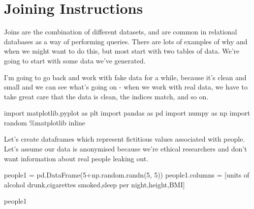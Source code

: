 \documentclass[
  letterpaper,
  DIV=11,
  numbers=noendperiod]{scrreprt}
\newenvironment{Shaded}{\begin{snugshade}}{\end{snugshade}}
\newcommand{\DecValTok}[1]{\textcolor[rgb]{0.68,0.00,0.00}{#1}}
\newcommand{\ImportTok}[1]{\textcolor[rgb]{0.00,0.46,0.62}{#1}}
\newcommand{\NormalTok}[1]{\textcolor[rgb]{0.00,0.23,0.31}{#1}}
\newcommand{\OperatorTok}[1]{\textcolor[rgb]{0.37,0.37,0.37}{#1}}
\newcommand{\StringTok}[1]{\textcolor[rgb]{0.13,0.47,0.30}{#1}}
\begin{document}
\hypertarget{joining-instructions}{%
\section{Joining Instructions}\label{joining-instructions}}

Joins are the combination of different datasets, and are common in
relational databases as a way of performing queries. There are lots of
examples of why and when we might want to do this, but most start with
two tables of data. We're going to start with some data we've generated.

I'm going to go back and work with fake data for a while, because it's
clean and small and we can see what's going on - when we work with real
data, we have to take great care that the data is clean, the indices
match, and so on.

\begin{Shaded}
\begin{Highlighting}[]
\ImportTok{import}\NormalTok{ matplotlib.pyplot }\ImportTok{as}\NormalTok{ plt}
\ImportTok{import}\NormalTok{ pandas }\ImportTok{as}\NormalTok{ pd}
\ImportTok{import}\NormalTok{ numpy }\ImportTok{as}\NormalTok{ np}
\ImportTok{import}\NormalTok{ random}
\OperatorTok{\%}\NormalTok{matplotlib inline}
\end{Highlighting}
\end{Shaded}

Let's create dataframes which represent fictitious values associated
with people. Let's assume our data is anonymised because we're ethical
researchers and don't want information about real people leaking out.

\begin{Shaded}
\begin{Highlighting}[]
\NormalTok{people1 }\OperatorTok{=}\NormalTok{ pd.DataFrame(}\DecValTok{5}\OperatorTok{+}\NormalTok{np.random.randn(}\DecValTok{5}\NormalTok{, }\DecValTok{5}\NormalTok{))}
\NormalTok{people1.columns }\OperatorTok{=}\NormalTok{ [}\StringTok{\textquotesingle{}units of alcohol drunk\textquotesingle{}}\NormalTok{,}\StringTok{\textquotesingle{}cigarettes smoked\textquotesingle{}}\NormalTok{,}\StringTok{\textquotesingle{}sleep per night\textquotesingle{}}\NormalTok{,}\StringTok{\textquotesingle{}height\textquotesingle{}}\NormalTok{,}\StringTok{\textquotesingle{}BMI\textquotesingle{}}\NormalTok{]}
\end{Highlighting}
\end{Shaded}

\begin{Shaded}
\begin{Highlighting}[]
\NormalTok{people1}
\end{Highlighting}
\end{Shaded}
\end{document}
